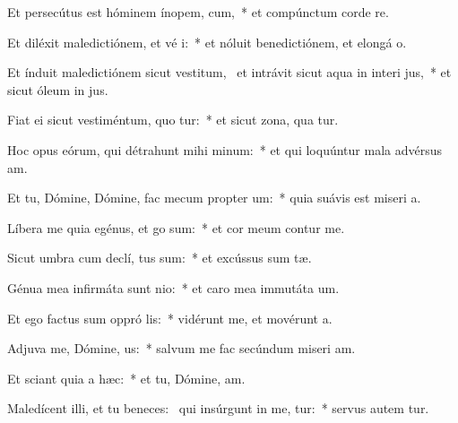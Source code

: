 \item Et persecútus est hóminem ínopem,  cum,~* et compúnctum corde re.
\item Et diléxit maledictiónem, et vé i:~* et nóluit benedictiónem, et elongá  o.
\item Et índuit maledictiónem sicut vestitum,~\pscross{} et intrávit sicut aqua in interi jus,~* et sicut óleum in  jus.
\item Fiat ei sicut vestiméntum, quo tur:~* et sicut zona, qua  tur.
\item Hoc opus eórum, qui détrahunt mihi  minum:~* et qui loquúntur mala advérsus  am.
\item Et tu, Dómine, Dómine, fac mecum propter  um:~* quia suávis est miseri a.
\item Líbera me quia egénus, et  go sum:~* et cor meum contur   me.
\item Sicut umbra cum declí, tus sum:~* et excússus sum  tæ.
\item Génua mea infirmáta sunt  nio:~* et caro mea immutáta   um.
\item Et ego factus sum oppró lis:~* vidérunt me, et movérunt  a.
\item Adjuva me, Dómine,  us:~* salvum me fac secúndum miseri am.
\item Et sciant quia  a hæc:~* et tu, Dómine,  am.
\item Maledícent illi, et tu beneces:~\pscross{} qui insúrgunt in me, tur:~* servus autem  tur.
